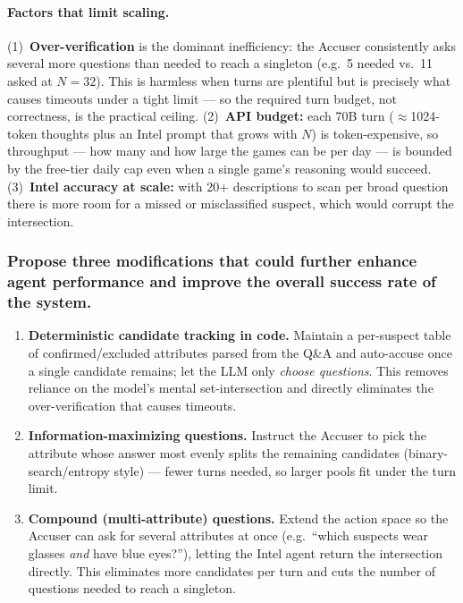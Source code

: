 \documentclass[11pt]{article}
\begin{document}
\paragraph{Factors that limit scaling.} (1)~\textbf{Over-verification} is the dominant
inefficiency: the Accuser consistently asks several more questions than needed to reach a
singleton (e.g.\ 5 needed vs.\ 11 asked at $N{=}32$). This is harmless when turns are
plentiful but is precisely
what causes timeouts under a tight limit --- so the required turn budget, not correctness,
is the practical ceiling. (2)~\textbf{API budget:} each 70B turn ($\approx$1024-token
thoughts plus an Intel prompt that grows with $N$) is token-expensive, so throughput --- how
many and how large the games can be per day --- is bounded by the free-tier daily cap even
when a single game's reasoning would succeed. (3)~\textbf{Intel accuracy at
scale:} with 20+ descriptions to scan per broad question there is more room for a missed or
misclassified suspect, which would corrupt the intersection.

\subsubsection*{Propose three modifications that could further enhance agent performance and
improve the overall success rate of the system.}
\begin{enumerate}[leftmargin=1.6em,itemsep=2pt]
  \item \textbf{Deterministic candidate tracking in code.} Maintain a per-suspect table of
  confirmed/excluded attributes parsed from the Q\&A and auto-accuse once a single candidate
  remains; let the LLM only \emph{choose questions}. This removes reliance on the model's
  mental set-intersection and directly eliminates the over-verification that causes
  timeouts.
  \item \textbf{Information-maximizing questions.} Instruct the Accuser to
  pick the attribute whose answer most evenly splits the remaining candidates
  (binary-search/entropy style) --- fewer turns needed, so larger pools fit under the turn
  limit.
  \item \textbf{Compound (multi-attribute) questions.} Extend the action space so the Accuser
  can ask for several attributes at once (e.g.\ ``which suspects wear glasses \emph{and} have
  blue eyes?''), letting the Intel agent return the intersection directly. This eliminates
  more candidates per turn and cuts the number of questions needed to reach a singleton.
\end{enumerate}
\end{document}
